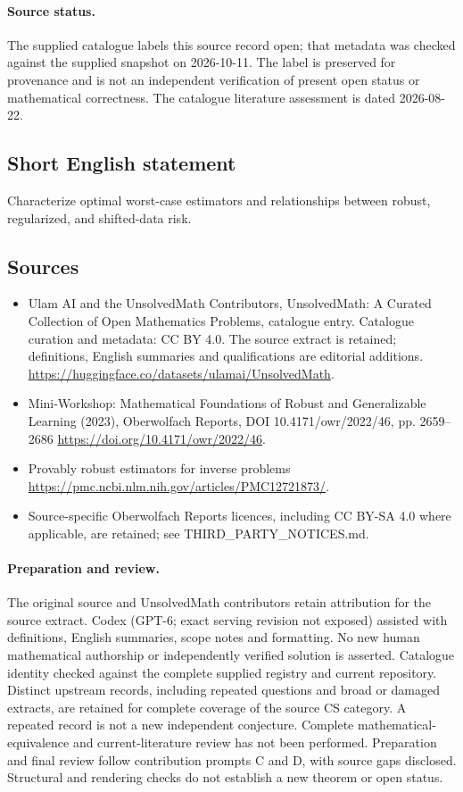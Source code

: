 \documentclass[11pt]{article}
\begin{document}
\paragraph{Source status.}
The supplied catalogue labels this source record open; that metadata was checked against the supplied snapshot on 2026-10-11. The label is preserved for provenance and is not an independent verification of present open status or mathematical correctness. The catalogue literature assessment is dated 2026-08-22.
\subsection{Short English statement}
Characterize optimal worst-case estimators and relationships between robust, regularized, and shifted-data risk.
\subsection{Sources}
\begin{itemize}
\item[S1] Ulam AI and the UnsolvedMath Contributors, UnsolvedMath: A Curated Collection of Open Mathematics Problems, catalogue entry. Catalogue curation and metadata: CC BY 4.0. The source extract is retained; definitions, English summaries and qualifications are editorial additions.
\url{https://huggingface.co/datasets/ulamai/UnsolvedMath}.
\item[S2] Mini-Workshop: Mathematical Foundations of Robust and Generalizable Learning (2023), Oberwolfach Reports, DOI 10.4171/owr/2022/46, pp. 2659--2686
\url{https://doi.org/10.4171/owr/2022/46}.
\item[S3] Provably robust estimators for inverse problems
\url{https://pmc.ncbi.nlm.nih.gov/articles/PMC12721873/}.
\item Source-specific Oberwolfach Reports licences, including CC BY-SA 4.0 where applicable, are retained; see THIRD\_PARTY\_NOTICES.md.
\end{itemize}
\paragraph{Preparation and review.}
The original source and UnsolvedMath contributors retain attribution for the source extract. Codex (GPT-6; exact serving revision not exposed) assisted with definitions, English summaries, scope notes and formatting. No new human mathematical authorship or independently verified solution is asserted. Catalogue identity checked against the complete supplied registry and current repository. Distinct upstream records, including repeated questions and broad or damaged extracts, are retained for complete coverage of the source CS category. A repeated record is not a new independent conjecture. Complete mathematical-equivalence and current-literature review has not been performed. Preparation and final review follow contribution prompts C and D, with source gaps disclosed. Structural and rendering checks do not establish a new theorem or open status.
\label{end:statement}
\end{document}
